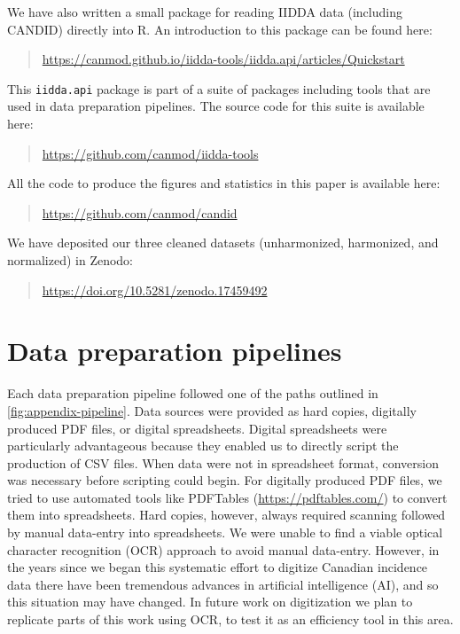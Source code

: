 \documentclass[12pt]{article}
\begin{document}
\noindent We have also written a small package for reading IIDDA data (including CANDID) directly into R. An introduction to this package can be found here:
\begin{quote}
\url{https://canmod.github.io/iidda-tools/iidda.api/articles/Quickstart}
\end{quote}
\noindent This \texttt{iidda.api} package is part of a suite of packages including tools that are used in data preparation pipelines. The source code for this suite is available here:
\begin{quote}
\url{https://github.com/canmod/iidda-tools}
\end{quote}

\noindent All the code to produce the figures and statistics in this paper is available here:
\begin{quote}
\url{https://github.com/canmod/candid}
\end{quote}

\noindent We have deposited our three cleaned datasets (unharmonized, harmonized, and normalized) in Zenodo:
\begin{quote}
\url{https://doi.org/10.5281/zenodo.17459492}
\end{quote}

\clearpage

\section{Data preparation pipelines}\label{sec:appendix-data-prep}

Each data preparation pipeline followed one of the paths outlined in \cref{fig:appendix-pipeline}. Data sources were provided as hard copies, digitally produced PDF files, or digital spreadsheets. Digital spreadsheets were particularly advantageous because they enabled us to directly script the production of CSV files. When data were not in spreadsheet format, conversion was necessary before scripting could begin. For digitally produced PDF files, we tried to use automated tools like PDFTables (\url{https://pdftables.com/}) to convert them into spreadsheets. Hard copies, however, always required scanning followed by manual data-entry into spreadsheets. We were unable to find a viable optical character recognition (OCR) approach to avoid manual data-entry. However, in the years since we began this systematic effort to digitize Canadian incidence data there have been tremendous advances in artificial intelligence (AI), and so this situation may have changed. In future work on digitization we plan to replicate parts of this work using OCR, to test it as an efficiency tool in this area.
\end{document}

